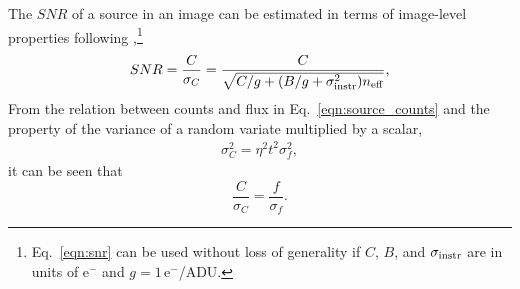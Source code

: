 \documentclass[DM,authoryear,toc]{lsstdoc}
\begin{document}
The $SNR$ of a source in an image can be estimated in terms of image-level properties following \citet[][]{SMTN-002},\footnote{Eq.~\ref{eqn:snr} can be used without loss of generality if $C$, $B$, and $\sigma_{\rm instr}$ are in units of e$^-$ and $g=1$\,e$^-$/ADU.}
\begin{equation}
    \label{eqn:snr}
    SNR = \frac{C}{\sigma_C} = \frac{C}{\sqrt{C/g + (B/g + \sigma_{\rm instr}^2)  n_{\rm eff}}},
\end{equation}
From the relation between counts and flux in Eq.~\ref{eqn:source_counts} and the property of the variance of a random variate multiplied by a scalar,
\begin{align}
\label{eqn:variance}
\sigma_C^2 = \eta^2 t^2 \sigma_f^2,
\end{align}
it can be seen that
\begin{equation}
    \frac{C}{\sigma_C} = \frac{f}{\sigma_f}.
\end{equation}
\end{document}

